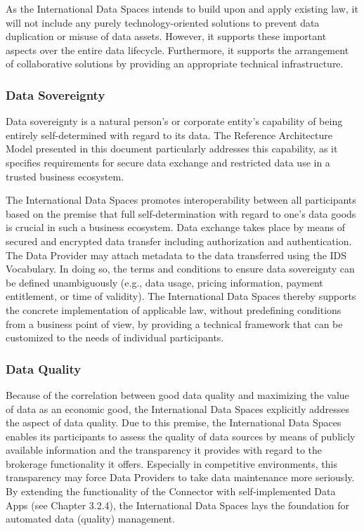 As the International Data Spaces intends to build upon and apply existing law, it will not include any purely technology-oriented solutions to prevent data duplication or misuse of data assets. However, it supports these important aspects over the entire data lifecycle. Furthermore, it supports the arrangement of collaborative solutions by providing an appropriate technical infrastructure.

\subsubsection{Data Sovereignty}
Data sovereignty is a natural person’s or corporate entity’s capability of being entirely self-determined with regard to its data. The Reference Architecture Model presented in this document particularly addresses this capability, as it specifies requirements for secure data exchange and restricted data use in a trusted business ecosystem.

The International Data Spaces promotes interoperability between all participants based on the premise that full self-determination with regard to one’s data goods is crucial in such a business ecosystem. Data exchange takes place by means of secured and encrypted data transfer including authorization and authentication. The Data Provider may attach metadata to the data transferred using the IDS Vocabulary. In doing so, the terms and conditions to ensure data sovereignty can be defined unambiguously (e.g., data usage, pricing information, payment entitlement, or time of validity). The International Data Spaces thereby supports the concrete implementation of applicable law, without predefining conditions from a business point of view, by providing a technical framework that can be customized to the needs of individual participants.

\subsubsection{Data Quality}
Because of the correlation between good data quality and maximizing the value of data as an economic good, the International Data Spaces explicitly addresses the aspect of data quality. Due to this premise, the International Data Spaces enables its participants to assess the quality of data sources by means of publicly available information and the transparency it provides with regard to the brokerage functionality it offers. Especially in competitive environments, this transparency may force Data Providers to take data maintenance more seriously. By extending the functionality of the Connector with self-implemented Data Apps (see Chapter 3.2.4), the International Data Spaces lays the foundation for automated data (quality) management.


